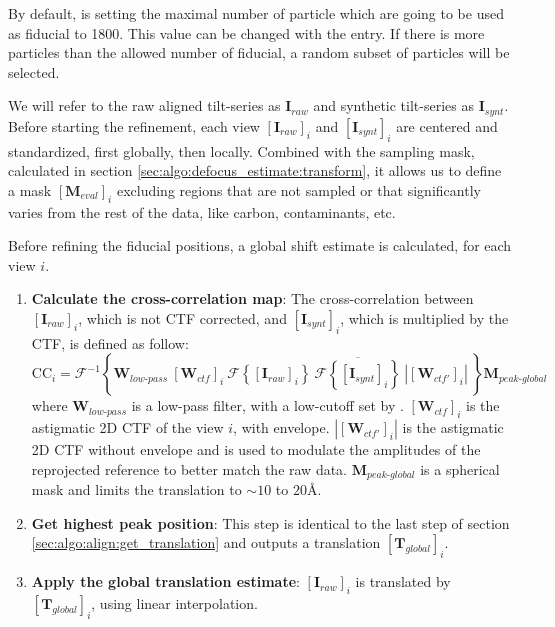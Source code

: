 By default, {\emClarity} is setting the maximal number of particle which are going to be used as fiducial to 1800. This value can be changed with the  entry. If there is more particles than the allowed number of fiducial, a random subset of particles will be selected.

We will refer to the raw aligned tilt-series as $\bm{I}_{raw}$ and synthetic tilt-series as $\bm{I}_{synt}$. Before starting the refinement, each view ${[\bm{I}_{raw}]}_i$ and ${[\bm{I}_{synt}]}_i$ are centered and standardized, first globally, then locally. Combined with the sampling mask, calculated in section \ref{sec:algo:defocus_estimate:transform}, it allows us to define a mask ${[\bm{M}_{eval}]}_i$ excluding regions that are not sampled or that significantly varies from the rest of the data, like carbon, contaminants, etc.

Before refining the fiducial positions, a global shift estimate is calculated, for each view $i$.
\begin{enumerate}
    \item \textbf{Calculate the cross-correlation map}: The cross-correlation between ${[\bm{I}_{raw}]}_i$, which is not CTF corrected, and ${[\bm{I}_{synt}]}_i$, which is multiplied by the CTF, is defined as follow:
    \begin{equation}
        \bm{\mathrm{CC}}_{i} = \mathcal{F}^{-1} \left\{ \bm{W}_{low\text{-}pass}\ {[\bm{W}_{ctf}]}_i\ \mathcal{F}\left\{ {[\bm{I}_{raw}]}_i \right\}\ \overline{\mathcal{F}\left\{ {[\bm{I}_{synt}]}_i \right\}}\ \left|{[\bm{W}_{ctf'}]}_i\right|\ \right\} \bm{M}_{peak\text{-}global}
    \end{equation}
    where $\bm{W}_{low\text{-}pass}$ is a low-pass filter, with a low-cutoff set by . ${[\bm{W}_{ctf}]}_i$ is the astigmatic 2D CTF of the view $i$, with envelope. $|{[\bm{W}_{ctf'}]}_i|$ is the astigmatic 2D CTF without envelope and is used to modulate the amplitudes of the reprojected reference to better match the raw data. $\bm{M}_{peak\text{-}global}$ is a spherical mask and limits the translation to $\sim 10$ to $20$\si{\angstrom}.
    
    \item \textbf{Get highest peak position}: This step is identical to the last step of section \ref{sec:algo:align:get_translation} and outputs a translation ${[\bm{T}_{global}]}_i$.
    
    \item \textbf{Apply the global translation estimate}: ${[\bm{I}_{raw}]}_i$ is translated by ${[\bm{T}_{global}]}_i$, using linear interpolation.
\end{enumerate}

